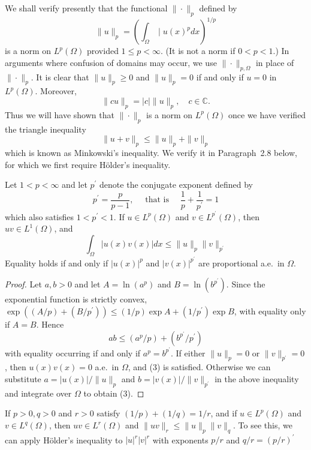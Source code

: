 \begin{para}
  We shall verify presently that the functional $\|\cdot\|_p$ defined by
  \[
  \|u\|_p=\left(\int_{\Omega} \mid u(x)^p d x\right)^{1 / p}
  \]
  is a norm on $L^p(\Omega)$ provided $1 \leq p<\infty$. (It is not a norm if $0<p<1$.)
  In arguments where confusion of domains may occur, we use $\|\cdot\|_{p, \Omega}$ in place of $\|\cdot\|_p$. 
  It is clear that $\|u\|_p \geq 0$ and $\|u\|_p=0$ if and only if $u=0$ in $L^p(\Omega)$. Moreover,
  \[
  \|c u\|_p=|c|\|u\|_p, \quad c \in \mathbb{C} .
  \]
  Thus we will have shown that $\|\cdot\|_p$ is a norm on $L^p(\Omega)$ once we have verified the
  triangle inequality
  \[
  \|u+v\|_p \leq\|u\|_p+\|v\|_p
  \]
  which is known as Minkowski's inequality. We verify it in Paragraph~2.8 below,
  for which we first require Hölder's inequality.
\end{para}

\begin{theorem}
  Let $1<p<\infty$ and let $p^{\prime}$ denote the conjugate exponent defined by
  \[
  p^{\prime}=\frac{p}{p-1}, \quad \text { that is } \quad \frac{1}{p}+\frac{1}{p^{\prime}}=1
  \]
  which also satisfies $1<p^{\prime}<1$. If $u \in L^p(\Omega)$ and $v \in L^{p^{\prime}}(\Omega)$,
  then $u v \in L^1(\Omega)$, and
  \begin{equation}\label{eq:2.3}
    \int_{\Omega}|u(x) v(x)| d x \leq\|u\|_p\|v\|_{p^{\prime}}
  \end{equation}
  Equality holds if and only if $|u(x)|^p$ and $|v(x)|^{p^{\prime}}$ are proportional a.e.~in $\Omega$.
\end{theorem}

\begin{proof}
  Let $a, b>0$ and let $A=\ln \left(a^p\right)$ and $B=\ln \left(b^{p^{\prime}}\right)$.
  Since the exponential function is strictly convex, $\exp \left((A / p)+\left(B / p^{\prime}\right)\right) \leq(1 / p) \exp A+\left(1 / p^{\prime}\right) \exp B$, with equality only if $A=B$. Hence
  \[
  a b \leq\left(a^p / p\right)+\left(b^{p^{\prime}} / p^{\prime}\right)
  \]
  with equality occurring if and only if $a^p=b^{p^{\prime}}$. If either $\|u\|_p=0$ or $\|v\|_{p^{\prime}}=0$, 
  then $u(x) v(x)=0$ a.e.~in $\Omega$, and (3) is satisfied. Otherwise we can substitute $a=|u(x)| /\|u\|_p$ and 
  $b=|v(x)| /\|v\|_{p^{\prime}}$ in the above inequality and integrate over $\Omega$ to obtain (3).
\end{proof}

\begin{corollary}
  If $p>0, q>0$ and $r>0$ satisfy $(1 / p)+(1 / q)=1 / r$, and if $u \in L^p(\Omega)$ and $v \in L^q(\Omega)$, then $u v \in L^r(\Omega)$ and $\|u v\|_r \leq\|u\|_p\|v\|_q$. To see this, we can apply Hölder's inequality to $|u|^r|v|^r$ with exponents $p / r$ and $q / r=(p / r)^{\prime}$
\end{corollary}

